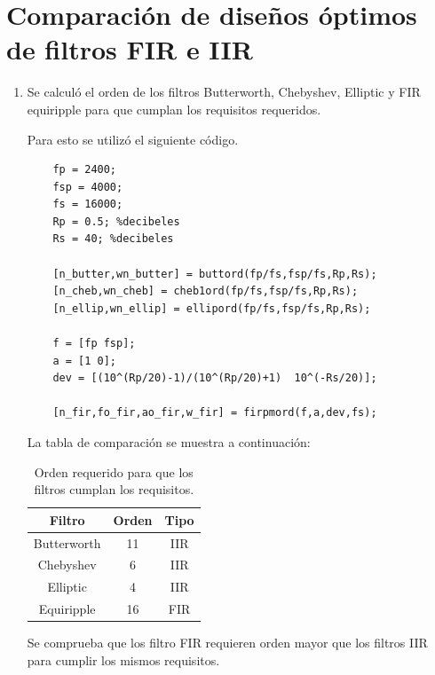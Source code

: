\documentclass[letterpaper,onecolumn,10pt,journal,final]{IEEEtran}
\begin{document}
%
%
\section{Comparación de diseños óptimos de filtros FIR e IIR}
\begin{enumerate}[1)]
    \item %
    Se calculó el orden de los filtros Butterworth, Chebyshev, Elliptic y FIR equiripple para que cumplan los requisitos requeridos.
    
    Para esto se utilizó el siguiente código.
    \begin{lstlisting}
    fp = 2400;
    fsp = 4000;
    fs = 16000;
    Rp = 0.5; %decibeles
    Rs = 40; %decibeles 
    
    [n_butter,wn_butter] = buttord(fp/fs,fsp/fs,Rp,Rs);
    [n_cheb,wn_cheb] = cheb1ord(fp/fs,fsp/fs,Rp,Rs);
    [n_ellip,wn_ellip] = ellipord(fp/fs,fsp/fs,Rp,Rs);
    
    f = [fp fsp];
    a = [1 0];
    dev = [(10^(Rp/20)-1)/(10^(Rp/20)+1)  10^(-Rs/20)];
    
    [n_fir,fo_fir,ao_fir,w_fir] = firpmord(f,a,dev,fs);
    \end{lstlisting}
    
    La tabla de comparación se muestra a continuación:
\begin{table}[H]
        \centering
        \begin{tabular}{|c|c|c|}
        \hline
            Filtro     & Orden & Tipo \\ \hline
            Butterworth & 11 & IIR \\
            Chebyshev     & 6 & IIR \\
            Elliptic     & 4 & IIR \\
            Equiripple    & 16 & FIR \\\hline
        \end{tabular}
        \caption{Orden requerido para que los filtros cumplan los requisitos.}
        \label{tab:1}
\end{table}

Se comprueba que los filtro FIR requieren orden mayor que los filtros IIR para cumplir los mismos requisitos.
        
\end{enumerate}
%
%
\end{document}
